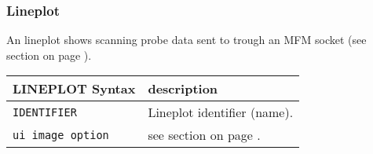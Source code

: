 \subsubsection{Lineplot}
\label{sec:uilineplot}
An lineplot shows scanning probe data sent to \INTENS{} trough an MFM socket
 (see section  on page \pageref{sec:opsocket}).



\begin{tabularx}{\textwidth}{l|X}
LINEPLOT Syntax     & description \\
\hline
\verb+IDENTIFIER+ & Lineplot identifier (name). \\
\verb+ui image option+ & see section \nameref{sec:uiimage} on page \pageref{sec:uiimage}.
\end{tabularx}
\vspace{1cm}
